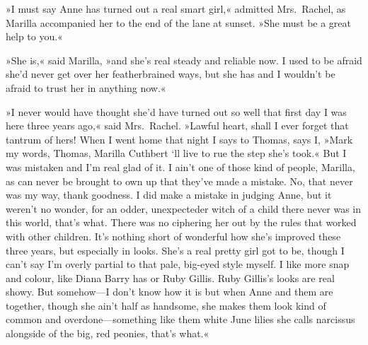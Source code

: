 »I must say Anne has turned out a real smart girl,« admitted Mrs.~Rachel, as Marilla accompanied her to the end of the lane at sunset. »She must be a great help to you.«

»She is,« said Marilla, »and she's real steady and reliable now. I used to be afraid she'd never get over her featherbrained ways, but she has and I wouldn't be afraid to trust her in anything now.«

»I never would have thought she'd have turned out so well that first day I was here three years ago,« said Mrs.~Rachel. »Lawful heart, shall I ever forget that tantrum of hers! When I went home that night I says to Thomas, says I, »Mark my words, Thomas, Marilla Cuthbert `ll live to rue the step she's took.« But I was mistaken and I'm real glad of it. I ain't one of those kind of people, Marilla, as can never be brought to own up that they've made a mistake. No, that never was my way, thank goodness. I did make a mistake in judging Anne, but it weren't no wonder, for an odder, unexpecteder witch of a child there never was in this world, that's what. There was no ciphering her out by the rules that worked with other children. It's nothing short of wonderful how she's improved these three years, but especially in looks. She's a real pretty girl got to be, though I can't say I'm overly partial to that pale, big-eyed style myself. I like more snap and colour, like Diana Barry has or Ruby Gillis. Ruby Gillis's looks are real showy. But somehow—I don't know how it is but when Anne and them are together, though she ain't half as handsome, she makes them look kind of common and overdone—something like them white June lilies she calls narcissus alongside of the big, red peonies, that's what.«